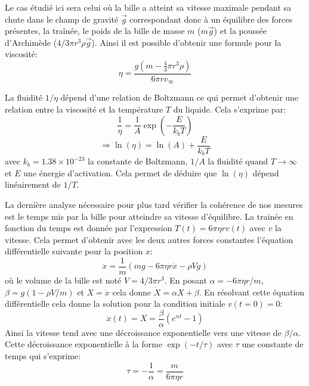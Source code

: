 Le cas étudié ici sera celui où la bille a atteint sa vitesse maximale pendant sa chute dans le champ de gravité $\vec{g}$ correspondant donc à un équilibre des forces présentes, la traînée, le poids de la bille de masse $m$ ($m\vec{g}$) et la poussée d'Archimède ($4/3 \pi r^3 \rho \vec{g}$). Ainsi il est possible d'obtenir une formule pour la viscosité:
\begin{equation}
    \eta = \frac{g(m-\frac{4}{3}\pi r^3 \rho)}{6\pi r v_\infty}
    \label{eq:viscosite}
\end{equation}

La fluidité $1/\eta$ dépend d'une relation de Boltzmann ce qui permet d'obtenir une relation entre la viscosité et la température $T$ du liquide. Cela s'exprime par:
\begin{equation}
    \frac{1}{\eta} = \frac{1}{A} \exp\left(-\frac{E}{k_b T}\right)
\end{equation}
\begin{equation}
    \Rightarrow \ln(\eta) = \ln(A) + \frac{E}{k_b T}
    \label{eq:ln_relation_boltzmann}
\end{equation}
avec $k_b = 1.38 \times 10^{-23}$ la constante de Boltzmann, $1/A$ la fluidité quand $T \to \infty$ et $E$ une énergie d'activation. Cela permet de déduire que $\ln(\eta)$ dépend linéairement de $1/T$.

La dernière analyse nécessaire pour plus tard vérifier la cohérence de nos mesures est le temps mis par la bille pour atteindre sa vitesse d'équilibre. La trainée en fonction du temps est donnée par l'expression $T(t) = 6\pi \eta r v(t)$ avec $v$ la vitesse. Cela permet d'obtenir avec les deux autres forces constantes l'équation différentielle suivante pour la position $x$:
\begin{equation}
    \ddot{x} = \frac{1}{m}(mg - 6\pi \eta r \dot{x} - \rho V g)
\end{equation}
où le volume de la bille est noté $V = 4/3 \pi r^3$. En posant $\alpha = -6\pi \eta r / m$, $\beta = g(1-\rho V/m)$ et $X = \dot{x}$ cela donne $\dot{X} = \alpha X + \beta$. En résolvant cette équation différentielle cela donne la solution pour la condition initiale $v(t=0)=0$:
\begin{equation}
    \dot{x}(t) = X = \frac{\beta}{\alpha}(e^{\alpha t} - 1)
\end{equation}
Ainsi la vitesse tend avec une décroissance exponentielle vers une vitesse de $\beta/\alpha$. Cette décroissance exponentielle à la forme $\exp(-t/\tau)$ avec $\tau$ une constante de temps qui s'exprime:
\begin{equation}
    \tau = -\frac{1}{\alpha} = \frac{m}{6\pi \eta r}
    \label{eq:constante_temps}
\end{equation}

